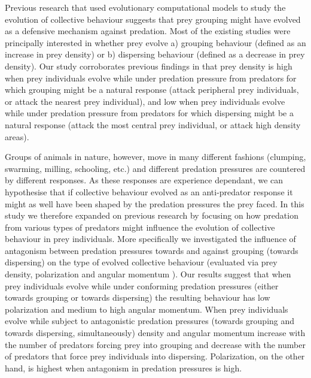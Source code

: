 Previous research that used evolutionary computational models to study the evolution of collective behaviour\cite{biswas2014causes,kunz2006prey,morrell2015consequences,olson2013predator,olson2016evolution} suggests that prey grouping might have evolved as a defensive mechanism against predation. Most of the existing studies were principally interested in whether prey evolve a) grouping behaviour (defined as an increase in prey density) or b) dispersing behaviour (defined as a decrease in prey density). Our study corroborates previous findings in that prey density is high when prey individuals evolve while under predation pressure from predators for which grouping might be a natural response (attack peripheral prey individuals, or attack the nearest prey individual), and low when prey individuals evolve while under predation pressure from predators for which dispersing might be a natural response (attack the most central prey individual, or attack high density areas).

Groups of animals in nature, however, move in many different fashions (clumping, swarming, milling, schooling, etc.) \cite{krause2002living,suzuki1973movement} and different predation pressures are countered by different responses. As these responses are experience dependant\cite{elmasri2012response,hellstrom2016balancing}, we can hypothesise that if collective behaviour evolved as an anti-predator response it might as well have been shaped by the predation pressures the prey faced. In this study we therefore expanded on previous research by focusing on how predation from various types of predators might influence the evolution of collective behaviour in prey individuals. More specifically we investigated the influence of antagonism between predation pressures towards and against grouping (towards dispersing) on the type of evolved collective behaviour (evaluated via prey density, polarization and angular momentum \cite{couzin2002collective}). Our results suggest that when prey individuals evolve while under conforming predation pressures (either towards grouping or towards dispersing) the resulting behaviour has low polarization and medium to high angular momentum. When prey individuals evolve while subject to antagonistic predation pressures (towards grouping and towards dispersing, simultaneously) density and angular momentum increase with the number of predators forcing prey into grouping and decrease with the number of predators that force prey individuals into dispersing. Polarization, on the other hand, is highest when antagonism in predation pressures is high.

